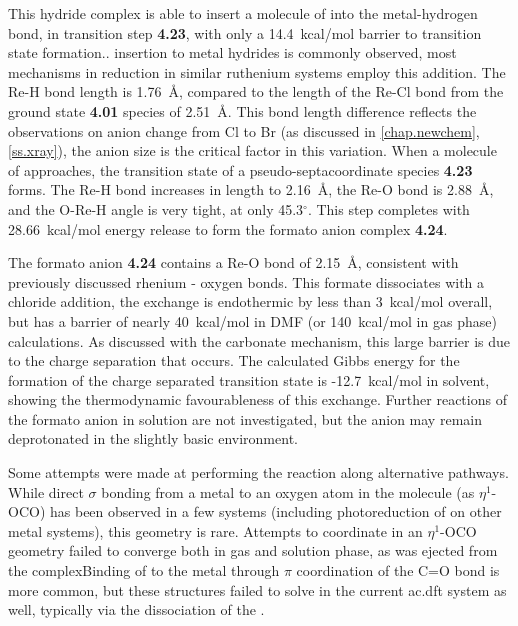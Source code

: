 This hydride complex is able to insert a molecule of  into the metal-hydrogen bond, in transition step \textbf{4.23}, with only a 14.4~kcal/mol barrier to transition state formation..  insertion to metal hydrides is commonly observed, most mechanisms in  reduction in similar ruthenium systems employ this addition\autocite{creutz2007}. The Re-H bond length is 1.76~\r{A}, compared to the length of the Re-Cl bond from the ground state \textbf{4.01} species of 2.51~\r{A}. This bond length difference reflects the observations on anion change from Cl to Br (as discussed in \autoref{chap.newchem}, \autoref{ss.xray}), the anion size is the critical factor in this variation. When a molecule of  approaches, the transition state of a pseudo-septacoordinate species \textbf{4.23} forms. The Re-H bond increases in length to 2.16~\r{A}, the Re-O bond is 2.88~\r{A}, and the O-Re-H angle is very tight, at only 45.3$^\circ$. This step completes with 28.66~kcal/mol energy release to form the formato anion complex \textbf{4.24}. 

The formato anion \textbf{4.24} contains a Re-O bond of 2.15~\r{A}, consistent with previously discussed rhenium - oxygen bonds. This formate dissociates with a chloride addition, the exchange is endothermic by less than 3~kcal/mol overall, but has a barrier of nearly 40~kcal/mol in DMF (or 140~kcal/mol in gas phase) calculations. As discussed with the carbonate mechanism, this large barrier is due to the charge separation that occurs. The calculated Gibbs energy for the formation of the charge separated transition state is -12.7~kcal/mol in solvent, showing the thermodynamic favourableness of this exchange. Further reactions of the formato anion in solution are not investigated, but the anion may remain deprotonated in the slightly basic environment\autocite{morimoto2013}. 

Some attempts were made at performing the reaction along alternative pathways. While direct $\sigma$ bonding from a metal to an oxygen atom in the  molecule (as $\eta^1$-OCO) has been observed in a few systems (including photoreduction of  on other metal systems)\autocite{lee2001, mauser2001, souter1997}, this geometry is rare\autocite{castrorodriguez2004, cokoja2011, gibson1996}. Attempts to coordinate  in an $\eta^1$-OCO geometry failed to converge both in gas and solution phase, as  was ejected from the complexBinding of  to the metal through $\pi$ coordination of the C=O bond is more common\autocite{cokoja2011, gibson1996}, but these structures failed to solve in the current \gls{ac.dft} system as well, typically via the dissociation of the .


